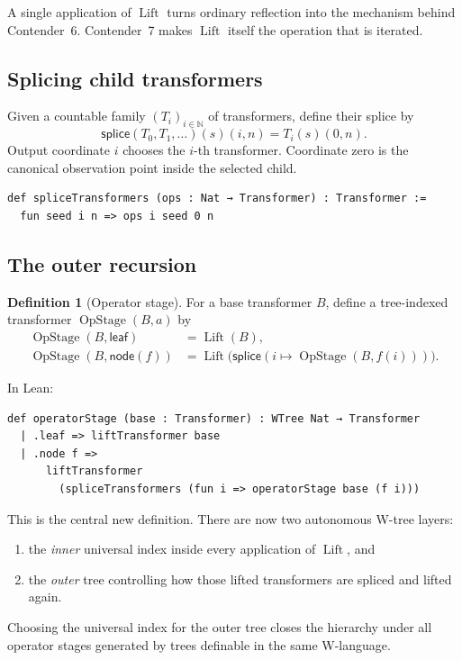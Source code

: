 \documentclass[11pt]{article}
\theoremstyle{definition}
\newtheorem{definition}[theorem]{Definition}
\theoremstyle{remark}
\newcommand{\N}{\mathbb{N}}
\newcommand{\Lift}{\operatorname{Lift}}
\newcommand{\OpStage}{\operatorname{OpStage}}
\begin{document}
A single application of \(\Lift\) turns ordinary reflection into the mechanism
behind Contender~6.  Contender~7 makes \(\Lift\) itself the operation that is
iterated.

\subsection{Splicing child transformers}

Given a countable family \((T_i)_{i\in\N}\) of transformers, define their
splice by
\[
  \mathsf{splice}(T_0,T_1,\ldots)(s)(i,n)=T_i(s)(0,n).
\]
Output coordinate \(i\) chooses the \(i\)-th transformer.  Coordinate zero is
the canonical observation point inside the selected child.

\begin{lstlisting}
def spliceTransformers (ops : Nat → Transformer) : Transformer :=
  fun seed i n => ops i seed 0 n
\end{lstlisting}

\subsection{The outer recursion}

\begin{definition}[Operator stage]
For a base transformer \(B\), define a tree-indexed transformer
\(\OpStage(B,a)\) by
\[
\begin{aligned}
  \OpStage(B,\mathsf{leaf})
    &=\Lift(B),\\
  \OpStage(B,\mathsf{node}(f))
    &=\Lift\bigl(\mathsf{splice}
       (i\mapsto\OpStage(B,f(i)))\bigr).
\end{aligned}
\]
\end{definition}

In Lean:
\begin{lstlisting}
def operatorStage (base : Transformer) : WTree Nat → Transformer
  | .leaf => liftTransformer base
  | .node f =>
      liftTransformer
        (spliceTransformers (fun i => operatorStage base (f i)))
\end{lstlisting}
This is the central new definition.  There are now two autonomous W-tree
layers:
\begin{enumerate}[leftmargin=*]
  \item the \emph{inner} universal index inside every application of
        \(\Lift\), and
  \item the \emph{outer} tree controlling how those lifted transformers are
        spliced and lifted again.
\end{enumerate}
Choosing the universal index for the outer tree closes the hierarchy under all
operator stages generated by trees definable in the same W-language.
\end{document}
